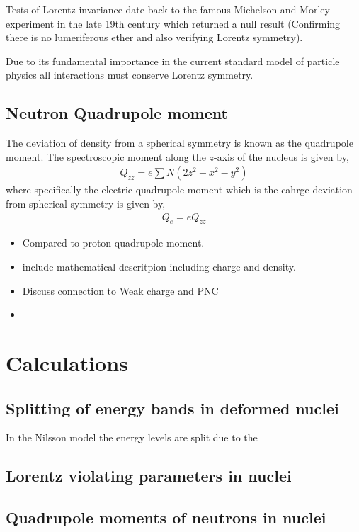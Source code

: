 \documentclass[10pt,a4paper]{report}
\begin{document}
Tests of Lorentz invariance date back to the famous Michelson and Morley experiment in the late 19th century \cite{Michelson1887} which returned a null result (Confirming there is no lumeriferous ether and also verifying Lorentz symmetry). 


Due to its fundamental importance in the current standard model of particle physics all interactions must conserve Lorentz symmetry.
\section{Neutron Quadrupole moment}
The deviation of density from a spherical symmetry is known as the quadrupole moment. The spectroscopic moment along the $z$-axis of the nucleus is given by,
\begin{align*}
Q_{zz} = e \sum{N}\left(2z^2 - x^2 -y^2\right)
\end{align*}
where specifically the electric quadrupole moment which is the cahrge deviation from spherical symmetry is given by,
\begin{align*}
Q_{e} = eQ_{zz}
\end{align*}
\begin{itemize}
\item Compared to proton quadrupole moment.
\item include mathematical descritpion including charge and density.
\item Discuss connection to Weak charge and PNC
\item 
\end{itemize}
\chapter{Calculations}
\section{Splitting of energy bands in deformed nuclei}
In the Nilsson model the energy levels are split due to the 
\section{Lorentz violating parameters in nuclei}
\section{Quadrupole moments of neutrons in nuclei}
\end{document}

